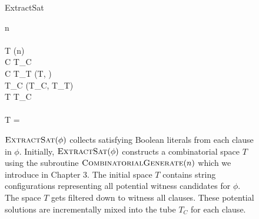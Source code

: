 
\begin{figure}[htbp]
\begin{center}

	\begin{pseudocode}{ExtractSat}{\phi}
	
	n  \phi \\
	\\
		T \GETS {}(n)\\
	
		\FOREACH {} C  \phi \DO
			\BEGIN
				T_C \GETS \emptyset \\
			
				\FOREACH {} \ell {} C \DO
					\BEGIN 
						T_T \GETS {}(T, \ell) \\
						T_C \GETS {}(T_C, T_T)
					\END \\
				T \GETS T_C \\
			\END \\
			
		\IF T = \emptyset
			\THEN {}\\
	\end{pseudocode}


\caption{$\text{\sc ExtractSat}(\phi)$ collects satisfying Boolean literals from each clause in $\phi$.  Initially, $\text{\sc ExtractSat}(\phi)$ constructs a combinatorial space $T$ using the subroutine $\text{\sc CombinatorialGenerate}(n)$ which we introduce in Chapter 3.  The initial space $T$ contains string configurations representing all potential witness candidates for $\phi$.  The space $T$ gets filtered down to witness all clauses.  These potential solutions are incrementally mixed into the tube $T_C$ for each clause.  }
\label{extractSatAlgorithm}
\end{center}
\end{figure}
